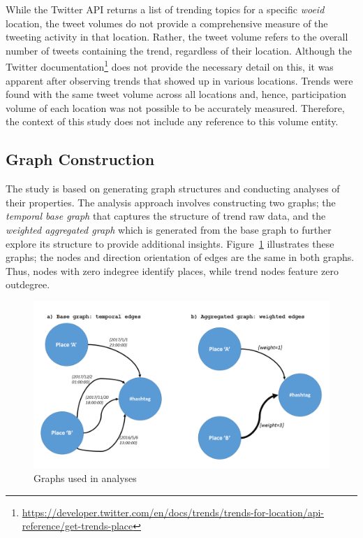 \documentclass{llncs}
\begin{document}
While the Twitter API returns a list of trending topics for a specific
{\emph{woeid}} location, the tweet volumes do not provide a
comprehensive measure of the tweeting activity in that
location. Rather, the tweet volume refers to the overall number of
tweets containing the trend, regardless of their location. Although
the Twitter
documentation\footnote{\url{https://developer.twitter.com/en/docs/trends/trends-for-location/api-reference/get-trends-place}}
does not provide the necessary detail on this, it was apparent after
observing trends that showed up in various locations. Trends were
found with the same tweet volume across all locations and, hence,
participation volume of each location was not possible to be
accurately measured. Therefore, the context of this study does not
include any reference to this volume entity.

\subsection{Graph Construction}

The study is based on generating graph structures and conducting
analyses of their properties. The analysis approach involves
constructing two graphs; the {\emph{temporal base graph}} that
captures the structure of trend raw data, and the {\emph{weighted
aggregated graph}} which is generated from the base graph to further
explore its structure to provide additional
insights. Figure~\ref{fig:graphexamples} illustrates these graphs; the
nodes and direction orientation of edges are the same in both
graphs. Thus, nodes with zero indegree identify places, while trend
nodes feature zero outdegree.

\begin{figure}[htb] \centering
\includegraphics[width=\columnwidth]{images/graphexamples.png}
\caption{Graphs used in analyses}
\label{fig:graphexamples}
\end{figure}
\end{document}
